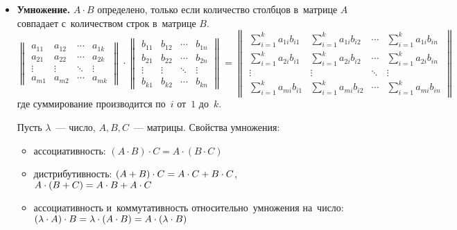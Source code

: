 \begin{itemize}
	\item\textbf{Умножение.} $A \cdot B$ определено, только если количество столбцов в~матрице $A$ совпадает с~количеством строк в~матрице $B$.
	\begin{equation*}
	\begin{Vmatrix}
	a_{11} & a_{12} & \cdots & a_{1k} \\ 
	a_{21} & a_{22} & \cdots & a_{2k} \\ 
	\vdots & \vdots & \ddots & \vdots \\ 
	a_{m1} & a_{m2} & \cdots & a_{mk}
	\end{Vmatrix} \cdot
	\begin{Vmatrix}
	b_{11} & b_{12} & \cdots & b_{1n} \\ 
	b_{21} & b_{22} & \cdots & b_{2n} \\ 
	\vdots & \vdots & \ddots & \vdots \\ 
	b_{k1} & b_{k2} & \cdots & b_{kn}
	\end{Vmatrix} =
	\begin{Vmatrix}
	\sum\limits_{i=1}^k a_{1i}b_{i1} & \sum\limits_{i=1}^k a_{1i}b_{i2} & \cdots & \sum\limits_{i=1}^k a_{1i}b_{in} \\
	\sum\limits_{i=1}^k a_{2i}b_{i1} & \sum\limits_{i=1}^k a_{2i}b_{i2} & \cdots & \sum\limits_{i=1}^k a_{2i}b_{in} \\
	\vdots & \vdots & \ddots & \vdots \\
	\sum\limits_{i=1}^k a_{mi}b_{i1} & \sum\limits_{i=1}^k a_{mi}b_{i2} & \cdots & \sum\limits_{i=1}^k a_{mi}b_{in}
	\end{Vmatrix}
	\end{equation*}
	где суммирование производится по~$i$ от~$1$ до~$k$.
	
	Пусть $\lambda$~--- число, $A, B, C$~--- матрицы. Свойства умножения:
	\begin{itemize}
		\item ассоциативность:
		$(A \cdot B) \cdot C = A \cdot (B \cdot C)$
		\item дистрибутивность:
		$(A + B) \cdot C \opbr= A \cdot C + B \cdot C$,
		$A \cdot (B + C) \opbr= A \cdot B + A \cdot C$
		\item ассоциативность и~коммутативность относительно~умножения на~число:
		$(\lambda \cdot A) \cdot B \opbr= \lambda \cdot (A \cdot B) \opbr= A \cdot (\lambda \cdot B)$
	\end{itemize}
	

\end{itemize}

